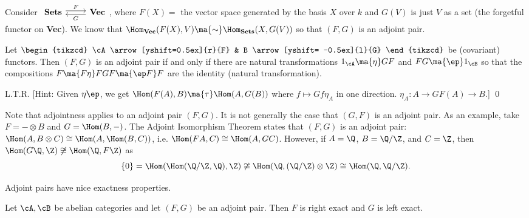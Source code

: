 \begin{ex}
Consider $\begin{tikzcd} \textbf{Sets} \arrow[yshift=0.5ex]{r}{F} & \textbf{Vec} \arrow[yshift= -0.5ex]{l}{G} \end{tikzcd}$, where $F(X)=$ the vector space generated by the basis $X$ over $k$ and $G(V)$ is just $V$ as a set (the forgetful functor on \textbf{Vec}). We know that $\Hom_{\textbf{Vec}}(F(X),V) \ma{\sim} \Hom_{\textbf{Sets}}(X,G(V))$ so that $(F,G)$ is an adjoint pair. \xqed
\end{ex}


\begin{thm}
Let $\begin{tikzcd} \cA \arrow[yshift=0.5ex]{r}{F} & B \arrow[yshift= -0.5ex]{l}{G} \end{tikzcd}$ be (covariant) functors. Then $(F,G)$ is an adjoint pair if and only if there are natural transformations $1_\cA \ma{\eta} GF$ and $FG \ma{\ep} 1_\cB$ so that the compositions $F \ma{F\eta} FGF \ma{\ep F}F$ are the identity (natural transformation).
\end{thm}

\pf L.T.R. [Hint: Given $\eta \ep$, we get $\Hom(F(A),B) \ma{\tau} \Hom(A,G(B))$ where $f \mapsto Gf \eta_A$ in one direction. $\eta_A: A \rightarrow GF(A) \rightarrow B$.] \qed \\


\begin{rem}
Note that adjointness applies to an adjoint pair $(F,G)$. It is not generally the case that $(G,F)$ is an adjoint pair. As an example, take $F= - \otimes B$ and $G= \Hom(B,-)$. The Adjoint Isomorphism Theorem states that $(F,G)$ is an adjoint pair: $\Hom(A, B \otimes C) \cong \Hom(A, \Hom(B,C))$, i.e. $\Hom(FA,C) \cong \Hom(A,GC)$. However, if $A=\Q$, $B=\Q/\Z$, and $C=\Z$, then $\Hom(G\Q,\Z) \not\cong \Hom(\Q,F\Z)$ as
	\[
	\{0\}= \Hom(\Hom(\Q/\Z,\Q),\Z) \not\cong \Hom(\Q, (\Q/\Z) \otimes \Z) \cong \Hom(\Q,\Q/\Z).
	\]
\end{rem}


Adjoint pairs have nice exactness properties.


\begin{thm}
Let $\cA,\cB$ be abelian categories and let $(F,G)$ be an adjoint pair. Then $F$ is right exact and $G$ is left exact. 
\end{thm}

